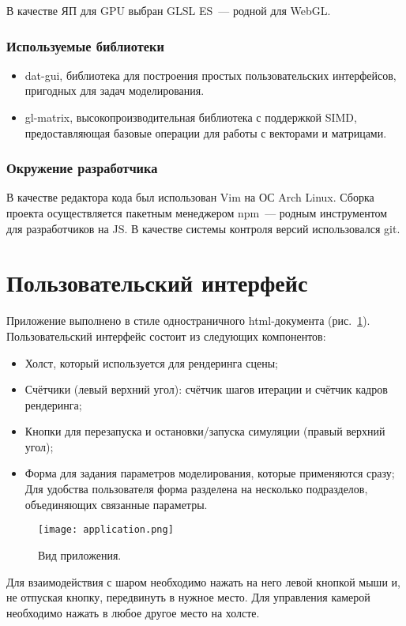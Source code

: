 В качестве ЯП для GPU выбран GLSL ES~--- родной для WebGL.


\subsubsection*{Используемые библиотеки}
\begin{itemize}
  \item dat-gui, библиотека для построения простых пользовательских интерфейсов, пригодных для задач моделирования.
  \item gl-matrix, высокопроизводительная библиотека с поддержкой SIMD, предоставляющая базовые операции для работы с векторами и матрицами.
\end{itemize}


\subsubsection*{Окружение разработчика}
В качестве редактора кода был использован Vim на ОС Arch Linux. Сборка проекта осуществляется пакетным менеджером npm~--- родным инструментом для разработчиков на JS. В качестве системы контроля версий использовался git.


\section{Пользовательский интерфейс}
Приложение выполнено в стиле одностраничного html-документа (рис.~\ref{fig:application}). Пользовательский интерфейс состоит из следующих компонентов:
\begin{itemize}
  \item Холст, который используется для рендеринга сцены;
  \item Счётчики (левый верхний угол): счётчик шагов итерации и счётчик кадров рендеринга;
  \item Кнопки для перезапуска и остановки/запуска симуляции (правый верхний угол);
  \item Форма для задания параметров моделирования, которые применяются сразу; Для удобства пользователя форма разделена на несколько подразделов, объединяющих связанные параметры.
\end{itemize}

\begin{figure}[h]
  \centering
  \texttt{[image: application.png]}
  \caption{Вид приложения.}
  \label{fig:application}
\end{figure}

Для взаимодействия с шаром необходимо нажать на него левой кнопкой мыши и, не отпуская кнопку, передвинуть в нужное место. Для управления камерой необходимо нажать в любое другое место на холсте.
